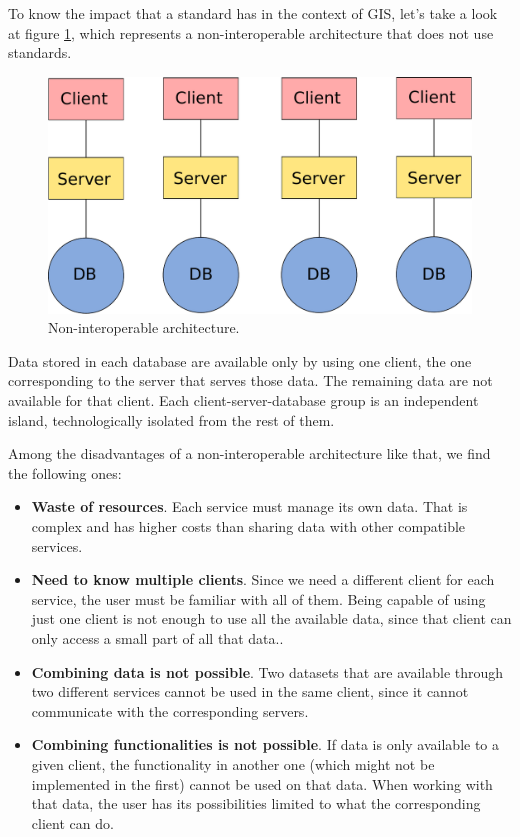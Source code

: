 To know the impact that a standard has in the context of GIS, let's take a look at figure \ref{Fig:Non_interoperable}, which represents a non-interoperable architecture that does not use standards.

\begin{figure}[!hbt]   
\centering
\includegraphics[width=.7\columnwidth]{Software/Non_interoperable.pdf}
\caption{\small Non-interoperable architecture.}
\label{Fig:Non_interoperable} 
\end{figure}

Data stored in each database are available only by using one client, the one corresponding to the server that serves those data. The remaining data are not available for that client. Each client-server-database group is an independent island, technologically isolated from the rest of them.

Among the disadvantages of a non-interoperable architecture like that, we find the following ones:

\begin{itemize}
\item \textbf{Waste of resources}. Each service must manage its own data. That is complex and has higher costs than sharing data with other compatible services.
\item \textbf{Need to know multiple clients}. Since we need a different client for each service, the user must be familiar with all of them. Being capable of using just one client is not enough to use all the available data, since that client can only access a small part of all that data..
\item \textbf{Combining data is not possible}. Two datasets that are available through two different services cannot be used in the same client, since it cannot communicate with the corresponding servers.
\item \textbf{Combining functionalities is not possible}. If data is only available to a given client, the functionality in another one (which might not be implemented in the first) cannot be used on that data. When working with that data, the user has its possibilities limited to what the corresponding client can do.
\end{itemize}

